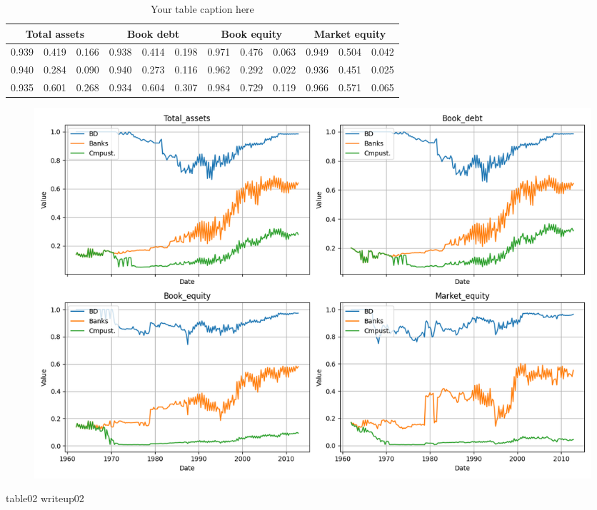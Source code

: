 \documentclass{article}
\begin{document}
\begin{adjustbox}{max width=\textwidth}

    \usepackage{booktabs} %
    \usepackage{graphicx} %

    \begin{table}[htbp]
      \centering
      \caption{Your table caption here}
      \label{tab:yourlabel}
    \begin{tabular}{lccccccccccc}
\toprule

    \multicolumn{3}{c}{Total assets} & \multicolumn{3}{c}{Book debt} & \multicolumn{3}{c}{Book equity} & \multicolumn{3}{c}{Market equity} \\
    \cmidrule(r{4pt}){1-3} \cmidrule(lr{4pt}){4-6} \cmidrule(lr{4pt}){7-9} \cmidrule(l{4pt}){10-12}
    \midrule
0.939 & 0.419 & 0.166 & 0.938 & 0.414 & 0.198 & 0.971 & 0.476 & 0.063 & 0.949 & 0.504 & 0.042 \\
0.940 & 0.284 & 0.090 & 0.940 & 0.273 & 0.116 & 0.962 & 0.292 & 0.022 & 0.936 & 0.451 & 0.025 \\
0.935 & 0.601 & 0.268 & 0.934 & 0.604 & 0.307 & 0.984 & 0.729 & 0.119 & 0.966 & 0.571 & 0.065 \\
\bottomrule
\end{tabular}

    \end{table}
    \end{adjustbox}

\begin{figure}[htbp]\centering\includegraphics[width=\linewidth]{table02_figure.png}\caption{}\end{figure}\par
\par
table02 writeup02\par
\end{document}
